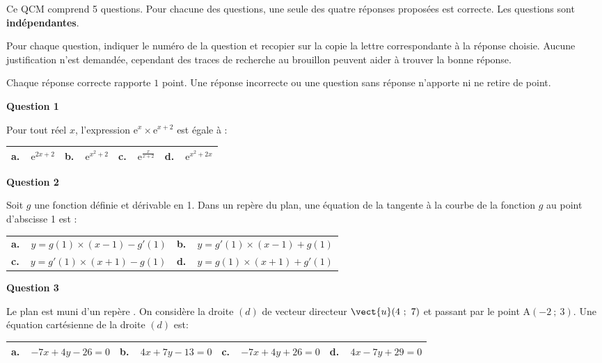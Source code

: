\medskip

Ce QCM comprend 5 questions. Pour chacune des questions, une seule des quatre réponses proposées est correcte. Les questions sont \textbf{indépendantes}. 

Pour chaque question, indiquer le numéro de la question et recopier sur la copie la lettre correspondante à la réponse choisie. Aucune justification n'est demandée, cependant des traces de recherche au brouillon peuvent aider à trouver la bonne réponse. 

Chaque réponse correcte rapporte $1$ point. Une réponse incorrecte ou une question sans réponse n'apporte ni ne retire de point.

\medskip

\textbf{Question 1}

Pour tout réel $x$, l'expression $\text{e}^x\times \text{e}^{x+2}$ est égale à :

\begin{center}
\begin{tabularx}{\linewidth}{|*{4}{X|}}\hline
\textbf{a.~~}$\text{e}^{2x+2}$&\textbf{b.~~}$\text{e}^{x^2+2}$&\textbf{c.~~}$\text{e}^{\frac{x}{x+2}}$&\textbf{d.~~}$\text{e}^{x^2 + 2x}$\\ \hline
\end{tabularx}
\end{center}
\textbf{Question 2}

Soit $g$ une fonction définie et dérivable en 1. Dans un repère du plan, une équation de la
tangente à la courbe de la fonction $g$ au point d'abscisse 1 est : 

\begin{center}
\begin{tabularx}{\linewidth}{|*{2}{X|}}\hline
\textbf{a.~~}$y=g(1) \times (x - 1)- g'(1)$&\textbf{b.~~}$y= g'(1) \times (x - 1) +g(1)$\\
\textbf{c.~~}$y = g'(1) \times (x + 1) - g(1)$&\textbf{d.~~}$y = g(1) \times (x + 1) + g'(1)$\\ \hline
\end{tabularx}
\end{center}

\textbf{Question 3}

Le plan est muni d'un repère \Oij. On considère la droite $(d)$ de vecteur directeur $\vect{u}(4~;~7)$ et passant par le point A$(-2~;~3)$. Une équation cartésienne de la droite $(d)$ est:

\begin{center}
\begin{tabularx}{\linewidth}{|*{4}{X|}}\hline
\textbf{a.~~}$- 7x + 4y- 26= 0$&\textbf{b.~~}$4x + 7y - 13 = 0$&\textbf{c.~~}$- 7x+ 4y+ 26= 0$&\textbf{d.~~}$4x - 7y + 29 = 0$\\ \hline
\end{tabularx}
\end{center}

